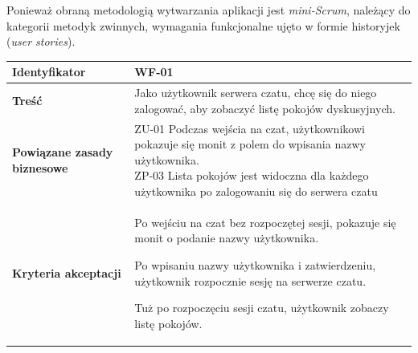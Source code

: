 Ponieważ obraną metodologią wytwarzania aplikacji jest \textit{mini-Scrum}, należący do kategorii metodyk zwinnych, wymagania funkcjonalne ujęto w formie historyjek (\textit{user stories}).

\vspace{2em} 

\begin{tabular}{ | l | l | }
	\hline
		\textbf{Identyfikator} & 
		WF-01
		\\
		
	\hline
		\textbf{Treść} & \parbox[t]{11cm}{
			Jako użytkownik serwera czatu, chcę się do niego zalogować, aby zobaczyć listę pokojów dyskusyjnych.
		}\\
		 
	\hline
		\parbox[t]{4cm}{\textbf{Powiązane zasady biznesowe}} & \parbox[t]{11cm}{
			ZU-01 Podczas wejścia na czat, użytkownikowi pokazuje się monit z polem do wpisania nazwy użytkownika. \\
			ZP-03 Lista pokojów jest widoczna dla każdego użytkownika
			po zalogowaniu się do serwera czatu
		}\\
		
	\hline
		\parbox[t]{4cm}{\textbf{Kryteria akceptacji}} & \parbox[t]{11cm}{
			\begin{enumreq}
				\item Po wejściu na czat bez rozpoczętej sesji, pokazuje się monit o podanie nazwy użytkownika.
				\item Po wpisaniu nazwy użytkownika i zatwierdzeniu, użytkownik rozpocznie sesję na serwerze czatu.
				\item Tuż po rozpoczęciu sesji czatu, użytkownik zobaczy listę pokojów.
			\end{enumreq}
			}
		\\

	\hline
\end{tabular}

\vspace{2em} 

